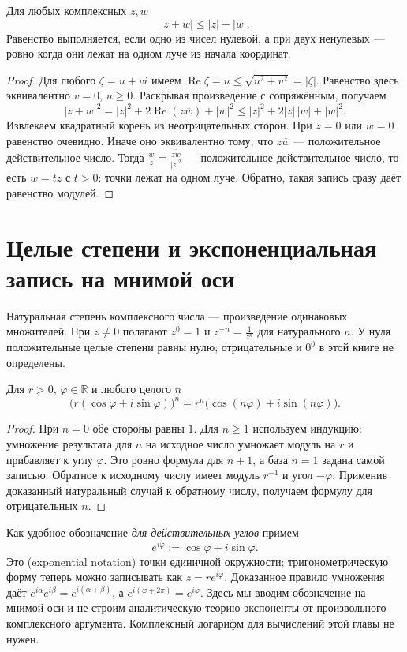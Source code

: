 \begin{theorem}\label{thm:legacy-c23-5}
Для любых комплексных \(z,w\)
\[
|z+w|\le|z|+|w|.
\]
Равенство выполняется, если одно из чисел нулевой, а при двух ненулевых — ровно когда они лежат на одном луче из начала координат.
\end{theorem}
\begin{proof}
Для любого \(\zeta=u+vi\) имеем \(\operatorname{Re}\zeta=u\le\sqrt{u^2+v^2}=|\zeta|\). Равенство здесь эквивалентно \(v=0\), \(u\ge0\). Раскрывая произведение с сопряжённым, получаем
\[
|z+w|^2=|z|^2+2\operatorname{Re}(z\overline w)+|w|^2
\le |z|^2+2|z|\,|w|+|w|^2.
\]
Извлекаем квадратный корень из неотрицательных сторон. При \(z=0\) или \(w=0\) равенство очевидно. Иначе оно эквивалентно тому, что \(z\overline w\) — положительное действительное число. Тогда \(\frac wz=\frac{\overline{z\overline w}}{|z|^2}\) — положительное действительное число, то есть \(w=tz\) с \(t>0\): точки лежат на одном луче. Обратно, такая запись сразу даёт равенство модулей.
\end{proof}

\section{Целые степени и экспоненциальная запись на мнимой оси}
Натуральная степень комплексного числа — произведение одинаковых множителей. При \(z\ne0\) полагают \(z^0=1\) и \(z^{-n}=\frac1{z^n}\) для натурального \(n\). У нуля положительные целые степени равны нулю; отрицательные и \(0^0\) в этой книге не определены.

\begin{theorem}\label{thm:legacy-c23-6}
Для \(r>0\), \(\varphi\in\mathbb R\) и любого целого \(n\)
\[
\bigl(r(\cos\varphi+i\sin\varphi)\bigr)^n
=r^n\bigl(\cos(n\varphi)+i\sin(n\varphi)\bigr).
\]
\end{theorem}
\begin{proof}
При \(n=0\) обе стороны равны \(1\). Для \(n\ge1\) используем индукцию: умножение результата для \(n\) на исходное число умножает модуль на \(r\) и прибавляет к углу \(\varphi\). Это ровно формула для \(n+1\), а база \(n=1\) задана самой записью. Обратное к исходному числу имеет модуль \(r^{-1}\) и угол \(-\varphi\). Применив доказанный натуральный случай к обратному числу, получаем формулу для отрицательных \(n\).
\end{proof}
Как удобное обозначение \emph{для действительных углов} примем
\[
e^{i\varphi}:=\cos\varphi+i\sin\varphi.
\]
Это  (exponential notation) точки единичной окружности; тригонометрическую форму теперь можно записывать как \(z=re^{i\varphi}\). Доказанное правило умножения даёт \(e^{i\alpha}e^{i\beta}=e^{i(\alpha+\beta)}\), а \(e^{i(\varphi+2\pi)}=e^{i\varphi}\). Здесь мы вводим обозначение на мнимой оси и не строим аналитическую теорию экспоненты от произвольного комплексного аргумента. Комплексный логарифм для вычислений этой главы не нужен.

